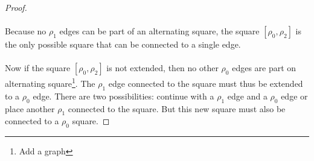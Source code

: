 \begin{proof}
  \paragraph{}
  Because no $\rho_1$ edges can be part of an alternating square, the square $[\rho_0, \rho_2]$ is the only possible square that can be connected to a single edge.

  \begin{figure}[H]
    \begin{center}
      \caption{}
    \end{center}
  \end{figure}

  \paragraph{}
  Now if the square $[\rho_0, \rho_2]$ is not extended, then no other $\rho_0$ edges are part on alternating square\footnote{Add a graph}. The $\rho_1$ edge connected to the square must thus be extended to a $\rho_0$ edge. There are two possibilities: continue with a $\rho_1$ edge and a $\rho_0$ edge or place another $\rho_1$ connected to the square. But this new square must also be connected to a $\rho_0$ square.


\end{proof}
